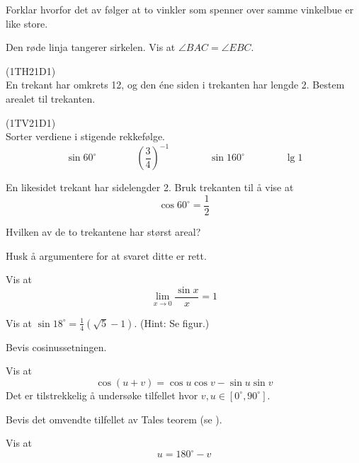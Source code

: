 Forklar hvorfor det av  følger at to vinkler som spenner over samme vinkelbue er like store.

 \vs
{}

\newpage
{}
Den røde linja tangerer sirkelen. Vis at $ \angle BAC=\angle EBC $.

\newpage
{} 
(1TH21D1) \\
En trekant har omkrets 12, og den éne siden i trekanten har lengde 2. Bestem arealet til trekanten.


(1TV21D1)\\
Sorter verdiene i stigende rekkefølge.
\[ \sin 60^\circ\qquad\qquad \left(\frac{3}{4}\right)^{-1}\qquad\qquad\sin 160^\circ\qquad\qquad \lg 1\]

En likesidet trekant har sidelengder 2.
Bruk trekanten til å vise at
\[ \cos 60^\circ = \frac{1}{2} \]

Hvilken av de to trekantene har størst areal? \os

Husk å argumentere for at svaret ditte er rett.

Vis at 
\[\lim\limits_{x\to0} \frac{\sin x}{x}=1 \]

\newpage
{}
Vis at $ \sin 18^\circ=\frac{1}{4}(\sqrt{5}-1) $. (Hint: Se figur.)


Bevis cosinussetningen.


Vis at
\[ \cos(u+v)= \cos u\cos v-\sin u \sin v \]
Det er tilstrekkelig å undersøke tilfellet hvor $ v,u \in [0^\circ, 90^\circ] $.

Bevis det omvendte tilfellet av Tales teorem (se  ).


Vis at
\[ u=180^\circ-v \]

